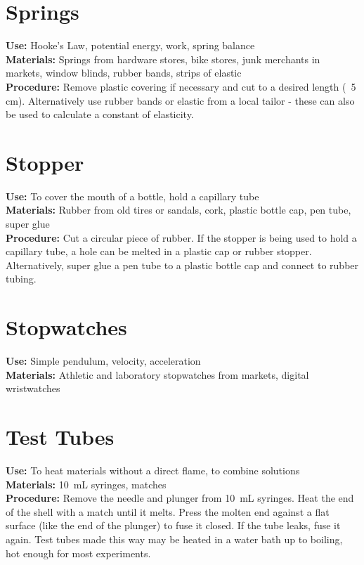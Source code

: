 \section{Springs}
\vspace{-10pt}
\textbf{Use:} Hooke's Law, potential energy, work, spring balance\\
\textbf{Materials:} Springs from hardware stores, bike stores, junk merchants in markets, window blinds, rubber bands, strips of elastic\\
\textbf{Procedure:} Remove plastic covering if necessary and cut to a desired length (~5 cm). Alternatively use rubber bands or elastic from a local tailor - these can also be used to calculate a constant of elasticity.

\section{Stopper}
\vspace{-10pt}
\textbf{Use:} To cover the mouth of a bottle, hold a capillary tube\\
\textbf{Materials:} Rubber from old tires or sandals, cork, plastic bottle cap, pen tube, super glue\\
\textbf{Procedure:} Cut a circular piece of rubber.  If the stopper is being used to hold a capillary tube, a hole can be melted in a plastic cap or rubber stopper. Alternatively, super glue a pen tube to a plastic bottle cap and connect to rubber tubing.

\section{Stopwatches}
\vspace{-10pt}
\textbf{Use:} Simple pendulum, velocity, acceleration\\
\textbf{Materials:} Athletic and laboratory stopwatches from markets, digital wristwatches

\section{Test Tubes}
\label{sec:testtubes}
\vspace{-10pt}
\textbf{Use:} To heat materials without a direct flame, to combine solutions\\
\textbf{Materials:} 10~mL syringes, matches\\
\textbf{Procedure:} Remove the needle and plunger from 10~mL syringes. Heat the end of the shell with a match until it melts. Press the molten end against a flat surface (like the end of the plunger) to fuse it closed. If the tube leaks, fuse it again. Test tubes made this way may be heated in a water bath up to boiling, hot enough for most experiments.

